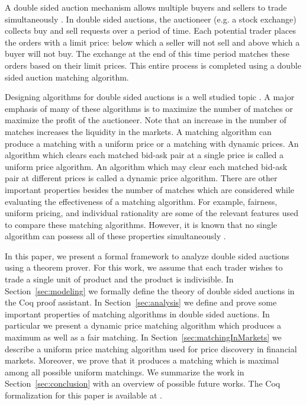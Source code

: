 \documentclass[a4paper,UKenglish,cleveref, autoref]{lipics-v2019}
\begin{document}
A double sided auction mechanism allows multiple buyers and sellers to trade simultaneously \cite{friedman}. In double sided auctions, the auctioneer (e.g. a stock exchange) collects buy and sell requests over a period of time. Each potential trader places the orders with a limit price: below which a seller will not sell and above which a buyer will not buy. The exchange at the end of this time period matches these orders based on their limit prices. This entire process is completed using a double sided auction matching algorithm.

Designing algorithms for double sided auctions is a well studied topic \cite{mcafee1992, WurmanWW98,NiuP13}. A major emphasis of many of these algorithms is to maximize the number of matches or maximize the profit of the auctioneer. Note that an increase in the number of matches increases the liquidity in the markets. A matching algorithm can produce a matching with a uniform price or a matching with dynamic prices. An algorithm which clears each matched bid-ask pair at a single price is called a uniform price algorithm. An algorithm which may clear each matched bid-ask pair at different prices is called a dynamic price algorithm. There are other important properties besides the number of matches which are considered while evaluating the effectiveness of a matching algorithm. For example, fairness, uniform pricing, and individual rationality are some of the relevant features used to compare these matching algorithms. However, it is known that no single algorithm can possess all of these properties simultaneously \cite{WurmanWW98,mcafee1992}.

In this paper, we present a formal framework to analyze double sided auctions using a theorem prover. For this work, we assume that each trader wishes to trade a single unit of product and the product is indivisible. In Section~\ref{sec:modeling} we formally define the theory of double sided auctions in the Coq proof assistant. In Section~\ref{sec:analysis} we define and prove some important properties of matching algorithms in double sided auctions. In particular we present a dynamic price matching algorithm which produces a maximum as well as a fair matching. In Section~\ref{sec:matchingInMarkets} we describe a uniform price matching algorithm used for price discovery in financial markets. Moreover, we prove that it produces a matching which is maximal among all possible uniform matchings. We summarize the work in Section~\ref{sec:conclusion} with an overview of possible future works. The Coq formalization for this paper is available at \cite{auctiongithub}.  
\end{document}
